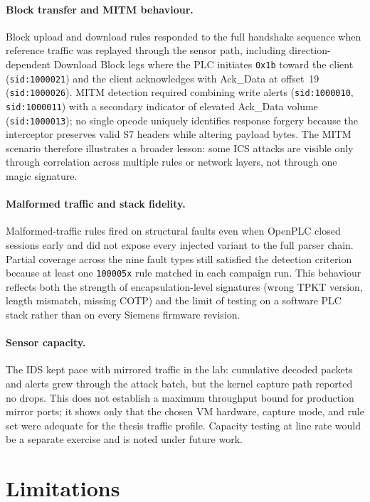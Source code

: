 \documentclass[../main.tex]{subfiles}
\begin{document}
\paragraph{Block transfer and MITM behaviour.}
Block upload and download rules responded to the full handshake sequence when reference traffic was replayed through the sensor path, including direction-dependent Download Block legs where the PLC initiates \texttt{0x1b} toward the client (\texttt{sid:1000021}) and the client acknowledges with Ack\_Data at offset~19 (\texttt{sid:1000026}). MITM detection required combining write alerts (\texttt{sid:1000010}, \texttt{sid:1000011}) with a secondary indicator of elevated Ack\_Data volume (\texttt{sid:1000013}); no single opcode uniquely identifies response forgery because the interceptor preserves valid S7 headers while altering payload bytes. The MITM scenario therefore illustrates a broader lesson: some ICS attacks are visible only through correlation across multiple rules or network layers, not through one magic signature.

\paragraph{Malformed traffic and stack fidelity.}
Malformed-traffic rules fired on structural faults even when OpenPLC closed sessions early and did not expose every injected variant to the full parser chain. Partial coverage across the nine fault types still satisfied the detection criterion because at least one \texttt{100005x} rule matched in each campaign run. This behaviour reflects both the strength of encapsulation-level signatures (wrong TPKT version, length mismatch, missing COTP) and the limit of testing on a software PLC stack rather than on every Siemens firmware revision.

\paragraph{Sensor capacity.}
The IDS kept pace with mirrored traffic in the lab: cumulative decoded packets and alerts grew through the attack batch, but the kernel capture path reported no drops. This does not establish a maximum throughput bound for production mirror ports; it shows only that the chosen VM hardware, capture mode, and rule set were adequate for the thesis traffic profile. Capacity testing at line rate would be a separate exercise and is noted under future work.

\section{Limitations}
\end{document}
